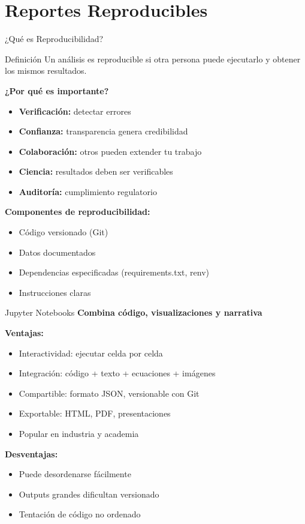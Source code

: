 \documentclass[aspectratio=169]{beamer}
\begin{document}
\section{Reportes Reproducibles}

\begin{frame}{¿Qué es Reproducibilidad?}
\begin{block}{Definición}
Un análisis es reproducible si otra persona puede ejecutarlo y obtener los mismos resultados.
\end{block}

\vspace{0.3cm}

\textbf{¿Por qué es importante?}
\begin{itemize}
\item \textbf{Verificación:} detectar errores
\item \textbf{Confianza:} transparencia genera credibilidad
\item \textbf{Colaboración:} otros pueden extender tu trabajo
\item \textbf{Ciencia:} resultados deben ser verificables
\item \textbf{Auditoría:} cumplimiento regulatorio
\end{itemize}

\vspace{0.3cm}

\textbf{Componentes de reproducibilidad:}
\begin{itemize}
\item Código versionado (Git)
\item Datos documentados
\item Dependencias especificadas (requirements.txt, renv)
\item Instrucciones claras
\end{itemize}
\end{frame}

\begin{frame}{Jupyter Notebooks}
\textbf{Combina código, visualizaciones y narrativa}

\vspace{0.3cm}

\textbf{Ventajas:}
\begin{itemize}
\item Interactividad: ejecutar celda por celda
\item Integración: código + texto + ecuaciones + imágenes
\item Compartible: formato JSON, versionable con Git
\item Exportable: HTML, PDF, presentaciones
\item Popular en industria y academia
\end{itemize}

\vspace{0.3cm}

\textbf{Desventajas:}
\begin{itemize}
\item Puede desordenarse fácilmente
\item Outputs grandes dificultan versionado
\item Tentación de código no ordenado
\end{itemize}
\end{frame}
\end{document}
